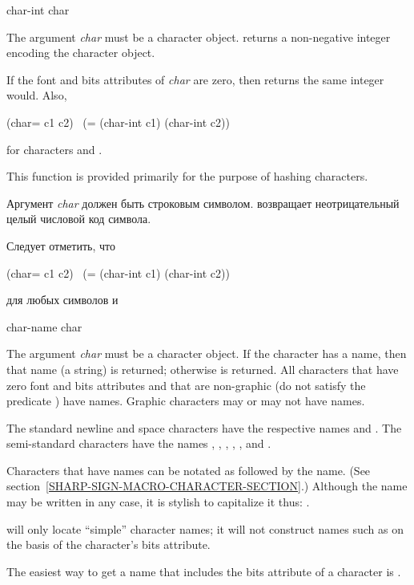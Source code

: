 \begin{defun}[Function]
char-int char

The argument \emph{char} must be a character object.
 returns a non-negative integer encoding the character object.

If the font and bits attributes of \emph{char} are zero, then
 returns the same integer  would.
Also,
\begin{lisp}
(char= c1 c2) \EQ\ (= (char-int c1) (char-int c2))
\end{lisp}
for characters  and .

This function is provided primarily for the purpose of hashing characters.

Аргумент \emph{char} должен быть строковым символом.
 возвращает неотрицательный целый числовой код символа.

Следует отметить, что
\begin{lisp}
(char= c1 c2) \EQ\ (= (char-int c1) (char-int c2))
\end{lisp}
для любых символов  и 
\end{defun}

\begin{defun}[Function]
char-name char

The argument \emph{char} must be a character object.
If the character has a name, then that name (a string) is returned;
otherwise {\false} is returned.  All characters that have
zero font and bits attributes and that are non-graphic
(do not satisfy the predicate ) have names.
Graphic characters may or may not have names.

The standard newline and space characters have the respective
names  and .
The semi-standard characters have the names
, , , , , and .


Characters that have names can be notated as \cd{\#{\Xbackslash}} followed
by the name.  (See section~\ref{SHARP-SIGN-MACRO-CHARACTER-SECTION}.)
Although the name may be written in any case,
it is stylish to capitalize it thus: .

 will only locate ``simple'' character names;
it will not construct names such as  on the
basis of the character's bits attribute.

\begin{new}
The easiest way to get a name that includes the bits attribute of
a character  is .
\end{new}
\end{defun}

